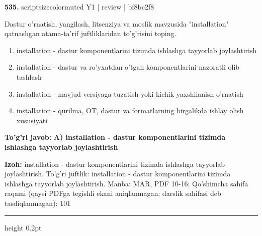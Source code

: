 \documentclass[10pt,a4paper]{article}
\begin{document}
{\bfseries\sffamily\color{ink} 535.} {scriptsizecolor{muted} Y1 | review | bf8bc2f8}
\par
Dastur o'rnatish, yangilash, litsenziya va moslik mavzusida "installation" qatnashgan atama-ta'rif juftliklaridan to'g'risini toping.
\begin{enumerate}[label=\Alph*),leftmargin=9mm]
\item installation - dastur komponentlarini tizimda ishlashga tayyorlab joylashtirish
\item installation - dastur va ro'yxatdan o'tgan komponentlarini nazoratli olib tashlash
\item installation - mavjud versiyaga tuzatish yoki kichik yaxshilanish o'rnatish
\item installation - qurilma, OT, dastur va formatlarning birgalikda ishlay olish xususiyati
\end{enumerate}
\begin{tcolorbox}[enhanced,breakable,colback=teal!4,colframe=teal!60!black,boxrule=0.45pt,arc=1.2mm,left=2.7mm,right=2.7mm,top=1.8mm,bottom=1.8mm,before skip=2mm,after skip=2mm]
{\bfseries\sffamily\color{teal}To'g'ri javob:} \textbf{A) installation - dastur komponentlarini tizimda ishlashga tayyorlab joylashtirish}
\par\smallskip
{\bfseries Izoh:} installation - dastur komponentlarini tizimda ishlashga tayyorlab joylashtirish. To'g'ri juftlik: installation - dastur komponentlarini tizimda ishlashga tayyorlab joylashtirish. Manba: MAR, PDF 10-16; Qo'shimcha sahifa raqami (qaysi PDFga tegishli ekani aniqlanmagan; darslik sahifasi deb tasdiqlanmagan): 101
\end{tcolorbox}
\vspace{2mm}\hrule height 0.2pt\vspace{3mm}
\end{document}
